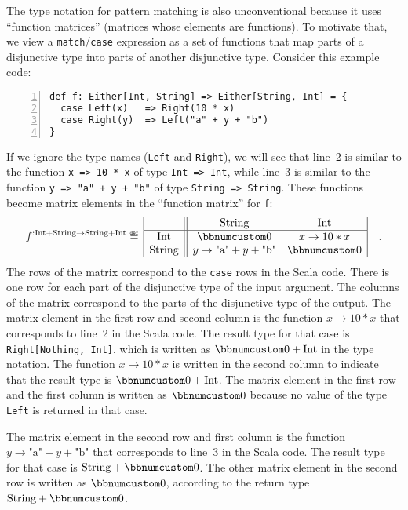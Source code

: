 The type notation for pattern matching is also unconventional because
it uses \textsf{``}function matrices\textsf{''} (matrices whose elements are functions).
To motivate that, we view a \lstinline!match!/\lstinline!case! expression
as a set of functions that map parts of a disjunctive type into parts
of another disjunctive type. Consider this example code:
\begin{lstlisting}[numbers=left]
def f: Either[Int, String] => Either[String, Int] = {
  case Left(x)   => Right(10 * x)
  case Right(y)  => Left("a" + y + "b")
}
\end{lstlisting}
If we ignore the type names (\lstinline!Left! and \lstinline!Right!),
we will see that line~2 is similar to the function \lstinline!x => 10 * x!
of type \lstinline!Int => Int!, while line~3 is similar to the function
\lstinline!y => "a" + y + "b"! of type \lstinline!String => String!.
These functions become matrix elements in the \textsf{``}function matrix\textsf{''}
for \lstinline!f!:
\[
f^{:\text{Int}+\text{String}\rightarrow\text{String}+\text{Int}}\triangleq\,\begin{array}{|c||cc|}
 & \text{String} & \text{Int}\\
\hline \text{Int} & \bbnum 0 & x\rightarrow10*x\\
\text{String} & y\rightarrow\text{"a"}+y+\text{"b"} & \bbnum 0
\end{array}\quad.
\]
The rows of the matrix correspond to the \lstinline!case! rows in
the Scala code. There is one row for each part of the disjunctive
type of the input argument. The columns of the matrix correspond to
the parts of the disjunctive type of the output.
The matrix element in the first row and second column is the function
$x\rightarrow10*x$ that corresponds to line~2 in the Scala code.
The result type for that case is \lstinline!Right[Nothing, Int]!,
which is written as $\bbnum 0+\text{Int}$ in the type notation. The
function $x\rightarrow10*x$ is written in the second column to indicate
that the result type is $\bbnum 0+\text{Int}$. The matrix element
in the first row and the first column is written as $\bbnum 0$ because
no value of the type \lstinline!Left! is returned in that case.

The matrix element in the second row and first column is the function
$y\rightarrow\text{"a"}+y+\text{"b"}$ that corresponds to line~3
in the Scala code. The result type for that case is $\text{String}+\bbnum 0$.
The other matrix element in the second row is written as $\bbnum 0$,
according to the return type $\text{String}+\bbnum 0$. 

